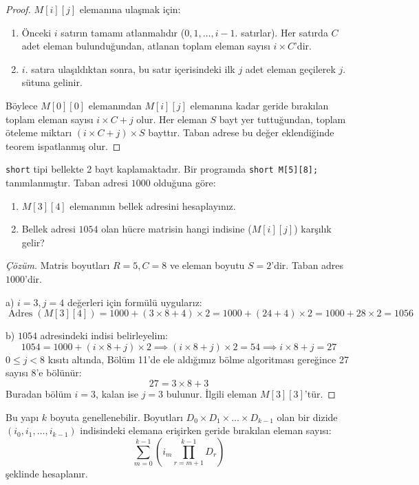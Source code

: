 \begin{proof}
$M[i][j]$ elemanına ulaşmak için:
\begin{enumerate}
    \item Önceki $i$ satırın tamamı atlanmalıdır ($0, 1, \dots, i-1$. satırlar). Her satırda $C$ adet eleman bulunduğundan, atlanan toplam eleman sayısı $i \times C$'dir.
    \item $i$. satıra ulaşıldıktan sonra, bu satır içerisindeki ilk $j$ adet eleman geçilerek $j$. sütuna gelinir.
\end{enumerate}
Böylece $M[0][0]$ elemanından $M[i][j]$ elemanına kadar geride bırakılan toplam eleman sayısı $i \times C + j$ olur. Her eleman $S$ bayt yer tuttuğundan, toplam öteleme miktarı $(i \times C + j) \times S$ bayttır. Taban adrese bu değer eklendiğinde teorem ispatlanmış olur.
\end{proof}

\begin{example}
\texttt{short} tipi bellekte 2 bayt kaplamaktadır. Bir programda \texttt{short M[5][8];} tanımlanmıştır. Taban adresi $1000$ olduğuna göre:
\begin{enumerate}
    \item[a)] $M[3][4]$ elemanının bellek adresini hesaplayınız.
    \item[b)] Bellek adresi $1054$ olan hücre matrisin hangi indisine ($M[i][j]$) karşılık gelir?
\end{enumerate}
\end{example}

\begin{proof}[Çözüm]
Matris boyutları $R = 5, C = 8$ ve eleman boyutu $S = 2$'dir. Taban adres $1000$'dir.

a) $i = 3, j = 4$ değerleri için formülü uygularız:
\[
\operatorname{Adres}(M[3][4]) = 1000 + (3 \times 8 + 4) \times 2 = 1000 + (24 + 4) \times 2 = 1000 + 28 \times 2 = 1056
\]

b) $1054$ adresindeki indisi belirleyelim:
\[
1054 = 1000 + (i \times 8 + j) \times 2 \implies (i \times 8 + j) \times 2 = 54 \implies i \times 8 + j = 27
\]
$0 \le j < 8$ kısıtı altında, Bölüm 11'de ele aldığımız bölme algoritması gereğince 27 sayısı 8'e bölünür:
\[
27 = 3 \times 8 + 3
\]
Buradan bölüm $i = 3$, kalan ise $j = 3$ bulunur. İlgili eleman $M[3][3]$'tür.
\end{proof}

Bu yapı $k$ boyuta genellenebilir. Boyutları $D_0 \times D_1 \times \dots \times D_{k-1}$ olan bir dizide $(i_0, i_1, \dots, i_{k-1})$ indisindeki elemana erişirken geride bırakılan eleman sayısı:
\[
\sum_{m=0}^{k-1} \left( i_m \prod_{r=m+1}^{k-1} D_r \right)
\]
şeklinde hesaplanır.

